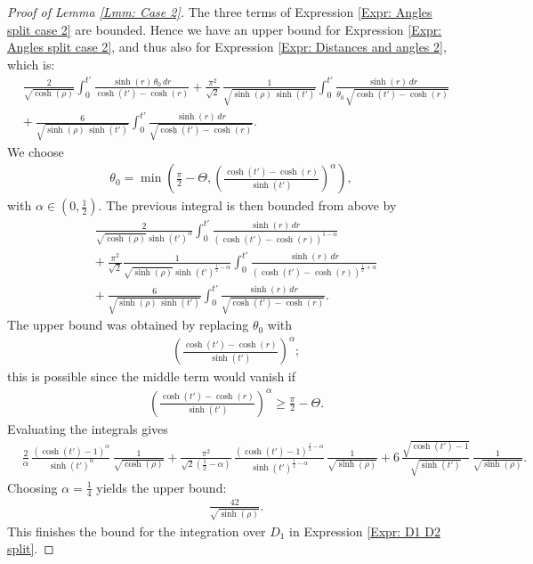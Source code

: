 \documentclass[11pt,twoside,reqno]{amsart} \usepackage{a4wide} \usepackage[T1]{fontenc} \usepackage[utf8]{inputenc} \usepackage{soul}  \usepackage{amsmath} \usepackage{amsfonts} \usepackage{amssymb} \usepackage{mathtools} \usepackage{amsthm} \usepackage{xcolor} \usepackage{graphicx} \usepackage{hyperref} \usepackage{standalone} \usepackage{esint} \usepackage{comment} \usepackage[left=2.3cm,top=3cm,right=2.3cm]{geometry} \usepackage{bm} \usepackage{svg} \usepackage{float} \numberwithin{equation}{section} \theoremstyle{plain} \newtheorem{thm}{Theorem}[section] \newtheorem{theorem}[thm]{Theorem} \newtheorem*{theorem*}{Theorem}\newtheorem{conj}[thm]{Conjecture} \newtheorem{lemma}[thm]{Lemma} \newtheorem{prop}[thm]{Proposition} \newtheorem{proposition}[thm]{Proposition} \newtheorem{cor}[thm]{Corollary} \newtheorem{question}[thm]{Question} \newtheorem{corollary}[thm]{Corollary} \newtheorem{assumption}[thm]{Assumption} \theoremstyle{definition} \newtheorem{defn}[thm]{Definition} \newtheorem{choice}[thm]{Choice} \newtheorem{definition}[thm]{Definition} \newtheorem{ex}[thm]{Example} \newtheorem{notation}[thm]{Notation} \newtheorem*{ack}{Acknowledgements} \theoremstyle{remark} \newtheorem{remark}[thm]{Remark} \newtheorem{bigremark}[thm]{Remark} \usepackage{xcolor} \newcommand{\red}[1]{ {\color{Red}#1} } \newcommand{\blue}[1]{ {\color{Blue}#1} } \author{Kai Hippi} \address{Aalto University, Espoo, Finland} \email{kai.hippi@aalto.fi}
\begin{document}
\begin{proof}[Proof of Lemma \ref{Lmm: Case 2}]
The three terms of Expression \eqref{Expr: Angles split case 2} are bounded. Hence we have an upper bound for Expression \eqref{Expr: Angles split case 2}, and thus also for Expression \eqref{Expr: Distances and angles 2}, which is: 
\begin{align*}
	&
	\frac{2}{ \sqrt{ \cosh( \rho ) } } \int_{0}^{t'} \frac{\sinh( r ) \, \theta_{0} \, dr}{  \cosh( t' ) - \cosh( r ) } 
	 +  
	\frac{\pi^{2}}{ \sqrt{2} } \, \frac{1}{\sqrt{ \sinh( \rho ) \, \sinh( t' ) }} \int_{0}^{t'} \frac{ \sinh( r ) \, dr }{ \theta_{0} \, \sqrt{ \cosh( t' ) - \cosh( r ) } }
	\\
	& + \
	\frac{6}{ \sqrt{ \sinh( \rho ) \, \sinh( t' ) } } \int_{0}^{t'} \frac{\sinh( r ) \, dr}{\sqrt{ \cosh( t' ) - \cosh( r) }}.	
\end{align*}
We choose
\begin{align*}
	\theta_{0} = \min \left( \frac{\pi}{2} - \Theta, \left( \frac{ \cosh( t' ) - \cosh( r ) }{ \sinh( t' ) } \right)^{\alpha} \right),
\end{align*}
with $ \alpha \in ( 0, \frac{1}{2} ) $. The previous integral is then bounded from above by
\begin{align*}
	&
	\frac{2}{ \sqrt{ \cosh( \rho ) } \sinh( t' )^{\alpha} } \int_{0}^{t'} \frac{\sinh( r ) \, dr}{ ( \cosh( t' ) - \cosh( r ) )^{ 1 - \alpha } } 
	\\
	& + \  
\frac{\pi^{2}}{ \sqrt{2} } \frac{1}{\sqrt{ \sinh( \rho ) }  \sinh( t' )^{ \frac{1}{2} - \alpha } } \int_{0}^{t'} \frac{ \sinh( r ) \, dr }{ ( \cosh( t' ) - \cosh( r ) )^{ \frac{1}{2} + \alpha } }
	\\
	& + \
	\frac{6}{ \sqrt{ \sinh( \rho ) \, \sinh( t' ) } } \int_{0}^{t'} \frac{\sinh( r ) \, dr}{\sqrt{ \cosh( t' ) - \cosh( r ) }}.
\end{align*}
The upper bound was obtained by replacing $ \theta_{0} $ with
\begin{align*}
	&
	\left(  \frac{\cosh( t' ) - \cosh( r ) }{ \sinh( t' ) } \right)^{\alpha};
\end{align*}
this is possible since the middle term would vanish if
\begin{align*}
	&
	\left(  \frac{\cosh( t' ) - \cosh( r ) }{ \sinh( t' ) } \right)^{\alpha} \geq \frac{\pi}{2} - \Theta.
\end{align*}
Evaluating the integrals gives
\begin{align*}
	&
	\frac{2}{\alpha} \, \frac{ ( \cosh( t' ) - 1 )^{\alpha} }{ \sinh( t' )^{\alpha} } \, \frac{1}{\sqrt{ \cosh( \rho ) }} + \frac{\pi^{2}}{\sqrt{2} ( \frac{1}{2} - \alpha ) } \, \frac{ ( \cosh( t' ) - 1 )^{\frac{1}{2} - \alpha} }{ \sinh( t' )^{ \frac{1}{2}- \alpha } } \, \frac{1}{\sqrt{\sinh(\rho)}} + 6 \, \frac{ \sqrt{ \cosh( t' ) - 1 } }{ \sqrt{ \sinh( t' ) } } \, \frac{1}{\sqrt{ \sinh( \rho ) }}.
\end{align*}
Choosing $ \alpha = \frac{1}{4} $ yields the upper bound:
\begin{align*}
	&
	\frac{42}{\sqrt{ \sinh( \rho ) }}.
\end{align*}
This finishes the bound for the integration over $ D_{1} $ in Expression \eqref{Expr: D1 D2 split}. 


\end{proof}
\end{document}
